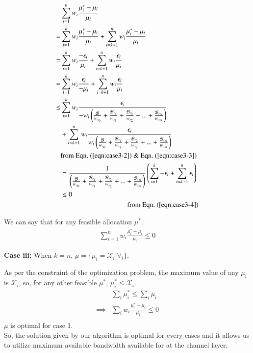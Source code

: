 \begin{equation}
	\begin{split}
	& \sum_{i=1}^{n} w_i \frac{\mu_i^* - \mu_i}{\mu_i} \\
	=& \sum_{i=1}^{k} w_i \frac{\mu_i^* - \mu_i}{\mu_i} + \sum_{i=k+1}^{n} w_i \frac{\mu_i^* - \mu_i}{\mu_i} \\
	=& \sum_{i=1}^{k} w_i \frac{-\epsilon_i}{\mu_i} + \sum_{i=k+1}^{n} w_i \frac{\epsilon_i}{\mu_i}\\
	=& \sum_{i=1}^{k} w_i \frac{\epsilon_i}{-\mu_i} + \sum_{i=k+1}^{n} w_i \frac{\epsilon_i}{\mu_i}\\
	\le & \sum_{i=1}^{k} w_i \frac{\epsilon_i}{- w_i \left( \frac{\mathcal{B}}{w_{s_0}} + \frac{\mathcal{B}_{r_1}}{w_{s_1}} + \frac{\mathcal{B}_{r_2}}{w_{s_2}} + ... + \frac{\mathcal{B}_{r_m}}{w_{s_m}} \right)} \\ 
	& + \sum_{i=k+1}^{n} w_i \frac{\epsilon_i}{w_i \left( \frac{\mathcal{B}}{w_{s_0}} + \frac{\mathcal{B}_{r_1}}{w_{s_1}} + \frac{\mathcal{B}_{r_2}}{w_{s_2}} + ... + \frac{\mathcal{B}_{r_m}}{w_{s_m}} \right)} \\
	& \omit\hfill \text{from Eqn.~(\ref{eqn:case3-2}) \& Eqn.~(\ref{eqn:case3-3})} \\
	&= \frac{1}{\left( \frac{\mathcal{B}}{w_{s_0}} + \frac{\mathcal{B}_{r_1}}{w_{s_1}} + \frac{\mathcal{B}_{r_2}}{w_{s_2}} + ... + \frac{\mathcal{B}_{r_m}}{w_{s_m}} \right)} \left( \sum_{i=1}^{k} -\epsilon_i + \sum_{i=k+1}^{n} \epsilon_i\right)  \\
	&\le 0\\
	& \omit\hfill \text{from Eqn.~(\ref{eqn:case3-4})}\\
	\end{split}
\end{equation}

We can say that for any feasible allocation $\mu^*$.
\begin{equation}
\begin{split}
\sum_{i=1}^{n} w_i \frac{\mu_i^* - \mu_i}{\mu_i} \le 0
\end{split}
\end{equation}


{\bf Case iii:} When $k=n$, $\mu = \{\mu_i = \mathcal{X}_i | \forall_i\}$.

As per the constraint of the optimization problem, the maximum value of any $\mu_i$ is $\mathcal{X}_i$, so, for any other feasible $\mu^*$, $\mu_i^* \le \mathcal{X}_i$. 
\begin{equation}
\begin{split}
&\sum_i \mu_i^* \le \sum_i \mu_i \\
\implies &\sum_i w_i \frac{ \mu_i^* - \mu_i }{\mu_i} \le 0 \\
\end{split}
\end{equation} 
$\mu$ is optimal for case 1.
\\



So, the solution given by our algorithm is optimal for every cases and it allows us to utilize maximum available bandwidth available for at the channel layer.

